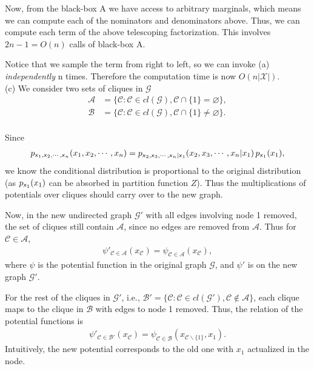 \documentclass{article}
\newcommand{\s}[1]{\textsf{\textit{#1}}}
\let\emptyset\varnothing
\begin{document}
Now, from the black-box A we have access to arbitrary marginals,
which means we can compute each of the nominators and denominators above.
Thus, we can compute each term of the above telescoping factorization.
This involves $2n -1 = O(n)$ calls of black-box A.

Notice that we sample the term from right to left, so we can invoke (a) \emph{independently} n times. Therefore the computation
time is now $O(n|\mathscr{X}|)$.
\\

%
\noindent
(c) We consider two sets of cliques in $\mathscr{G}$
\begin{align*}
\mathcal{A} &= \Big\{\mathscr{C}: \mathscr{C} \in cl(\mathscr{G}), \mathscr{C}\cap\{1\} = \emptyset \Big\},\\
\mathscr{B} &= \Big\{\mathscr{C}: \mathscr{C} \in cl(\mathscr{G}), \mathscr{C}\cap\{1\} \neq \emptyset \Big\}.
\end{align*}
\\
%
Since
\begin{align*}
p_{\s{x}_1, \s{x}_2, \cdots, \s{x}_n}(x_1, x_2, \cdots, x_n) = p_{\s{x}_2, \s{x}_3, \cdots, \s{x}_n | \s{x}_1}(x_2, x_3, \cdots, x_n | x_1) \,p_{\s{x}_1}(x_1),
\end{align*}
we know the conditional distribution is proportional to the original distribution (as $p_{\s{x}_1}(x_1)$ can be absorbed in partition function $Z$). Thus the multiplications of potentials over cliques should carry over to the new graph.

Now, in the new undirected graph $\mathscr{G}'$ with all edges involving node 1 removed, the set of cliques still contain $\mathscr{A}$, since no edges are removed from $\mathscr{A}$. Thus for $\mathscr{C}\in\mathscr{A}$,
\begin{align*}
\psi'_{\mathscr{C}\in\mathscr{A}}(x_{\mathscr{C}}) =
\psi_{\mathscr{C}\in\mathscr{A}}(x_{\mathscr{C}}),	
\end{align*}
where $\psi$ is the potential function in the original graph $\mathscr{G}$, and $\psi'$ is on the new graph $\mathscr{G}'$.

For the rest of the cliques in $\mathscr{G}'$, i.e., $\mathscr{B}' = \Big\{\mathscr{C}: \mathscr{C} \in cl(\mathscr{G}'), \mathscr{C} \not\in \mathscr{A}\Big\}$, each clique maps to the clique in $\mathscr{B}$ with edges to node 1 removed. Thus, the relation of the potential functions is
\begin{align*}
\psi'_{\mathscr{C}\in\mathscr{B}'}(x_{\mathscr{C}}) = \psi_{\mathscr{C}\in\mathscr{B}}(x_{\mathscr{C} \backslash \{1\}}, x_1).	
\end{align*}
Intuitively, the new potential corresponds to the old one with $x_1$ actualized in the node.
\\
\end{document}
